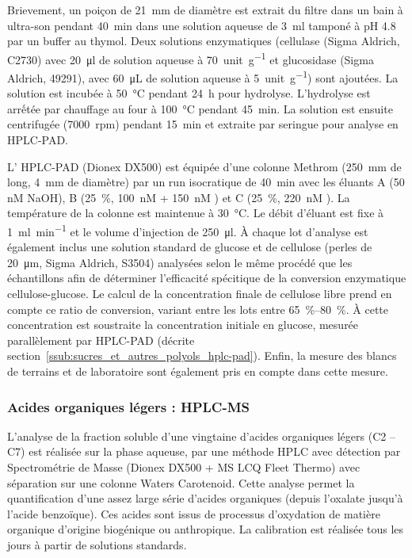 Brievement, un poiçon de \SI{21}{\mm} de diamètre est extrait du filtre dans un bain à
ultra-son pendant \SI{40}{\minute} dans une solution aqueuse de \SI{3}{\ml} tamponé à pH
4.8 par un buffer au thymol. Deux solutions enzymatiques (cellulase (Sigma Aldrich, C2730)
avec \SI{20}{\ul} de solution aqueuse à \SI{70}{unit.\g^{-1}} et glucosidase (Sigma
Aldrich, 49291), avec \SI{60}{\micro\L} de solution aqueuse à \SI{5}{unit.\g^{-1}}) sont
ajoutées. La solution est incubée à \SI{50}{\degreeCelsius} pendant \SI{24}{h} pour
hydrolyse. L'hydrolyse est arrếtée par chauffage au four à \SI{100}{\degreeCelsius}
pendant \SI{45}{min}. La solution est ensuite centrifugée (\SI{7000}{rpm}) pendant
\SI{15}{min} et extraite par seringue pour analyse en HPLC-PAD.

L' HPLC-PAD (Dionex DX500) est équipée d'une colonne Methrom (\SI{250}{mm} de long,
\SI{4}{mm} de diamètre) par un run isocratique de \SI{40}{min} avec les éluants 
A (50 nM NaOH), B (\SI{25}{\percent}, \SI{100}{nM}  + \SI{150}{nM}
) et C (\SI{25}{\percent}, \SI{220}{nM} ). La température de la colonne
est maintenue à \SI{30}{\degreeCelsius}. Le débit d'éluant est fixe à
\SI{1}{\ml\per\minute} et le volume d'injection de \SI{250}{\ul}.
À chaque lot d'analyse est également inclus une solution standard de glucose et de
cellulose (perles de \SI{20}{\um}, Sigma Aldrich, S3504) analysées selon le même
procédé que les échantillons afin de déterminer l'efficacité spécitique de la conversion
enzymatique cellulose-glucose. Le calcul de la concentration finale de cellulose libre
prend en compte ce ratio de conversion, variant entre les lots entre
\SIrange{65}{80}{\percent}.
À cette concentration est soustraite la concentration initiale en glucose, mesurée
parallèlement par HPLC-PAD (décrite section~\ref{ssub:sucres_et_autres_polyols_hplc-pad}).
Enfin, la mesure des blancs de terrains et de laboratoire sont également pris en compte
dans cette mesure.

\subsubsection{Acides organiques légers : HPLC-MS}%
\label{ssub:acides_organiques_légers_hplc_ms}

L’analyse de la fraction soluble d’une vingtaine d’acides organiques légers (C2 – C7) est
réalisée sur la phase aqueuse, par une méthode HPLC avec détection par Spectrométrie de
Masse (Dionex DX500 + MS LCQ Fleet Thermo) avec séparation sur une colonne Waters
Carotenoid. Cette analyse permet la quantification d’une assez large série d'acides
organiques (depuis l’oxalate jusqu’à l’acide benzoïque). Ces acides sont issus de
processus d’oxydation de matière organique d’origine biogénique ou anthropique. La
calibration est réalisée tous les jours à partir de solutions standards.

